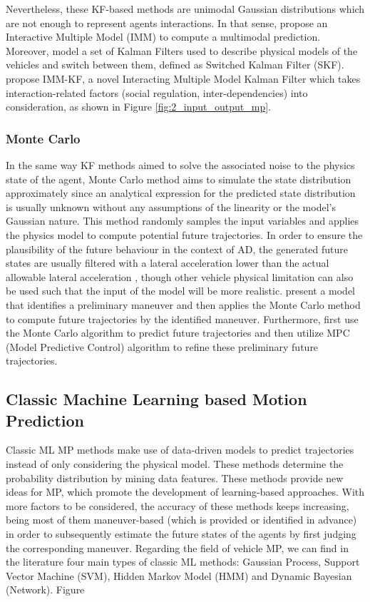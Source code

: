 Nevertheless, these KF-based methods are unimodal Gaussian distributions which are not enough to represent agents interactions. In that sense, \cite{kaempchen2004imm} propose an Interactive Multiple Model (IMM) to compute a multimodal prediction. Moreover, \cite{jin2015switched} model a set of Kalman Filters used to describe physical models of the vehicles and switch between them, defined as Switched Kalman Filter (SKF). \cite{lefkopoulos2020interaction} propose IMM-KF, a novel Interacting Multiple Model Kalman Filter which takes interaction-related factors (social regulation, inter-dependencies) into consideration, as shown in Figure \ref{fig:2_input_output_mp}.

\subsubsection{Monte Carlo}
\label{subsubsec:2_monte_carlo_mp}

In the same way KF methods aimed to solve the associated noise to the physics state of the agent, Monte Carlo method aims to simulate the state distribution approximately since an analytical expression for the predicted state distribution is usually unknown without any assumptions of the linearity or the model’s Gaussian nature. This method randomly samples the input variables and applies the physics model to compute potential future trajectories. In order to ensure the plausibility of the future behaviour in the context of \ac{AD}, the generated future states are usually filtered with a lateral acceleration lower than the actual allowable lateral acceleration \cite{broadhurst2005monte}, though other vehicle physical limitation can also be used such that the input of the model will be more realistic. \cite{okamoto2017driver} present a model that identifies a preliminary maneuver and then applies the Monte Carlo method to compute future trajectories by the identified maneuver. Furthermore, \cite{wang2019trajectory} first use the Monte Carlo algorithm to predict future trajectories and then utilize MPC (Model Predictive Control) algorithm to refine these preliminary future trajectories.

\subsection{Classic Machine Learning based Motion Prediction}
\label{sec:2_ml_based_mp}

Classic ML \ac{MP} methods make use of data-driven models to predict trajectories instead of only considering the physical model. These methods determine the probability distribution by mining data features. These methods provide new ideas for \ac{MP}, which promote the development of learning-based approaches. With more factors to be considered, the accuracy of these methods keeps increasing, being most of them maneuver-based (which is provided or identified in advance) in order to subsequently estimate the future states of the agents by first judging the corresponding maneuver. Regarding the field of vehicle \ac{MP}, we can find in the literature four main types of classic ML methods: Gaussian Process, Support Vector Machine (SVM), Hidden Markov Model (HMM) and Dynamic Bayesian (Network). Figure 

